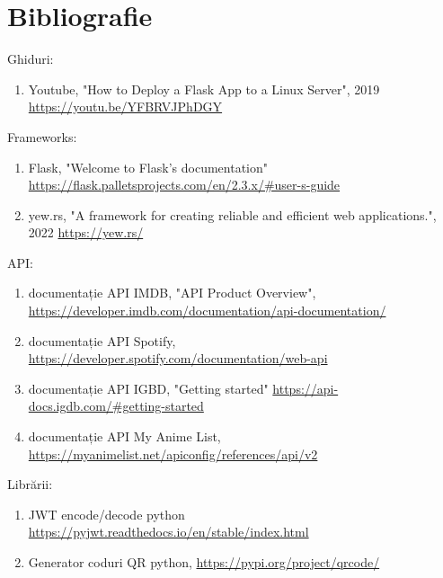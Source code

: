 \chapter*{Bibliografie} 
\label{Bibliografie}

\noindent Ghiduri:
\begin{enumerate}[noitemsep, leftmargin=0.3cm]
    \item Youtube, "How to Deploy a Flask App to a Linux Server", 2019\\
    \href{https://youtu.be/YFBRVJPhDGY}{https://youtu.be/YFBRVJPhDGY}
\end{enumerate}

\noindent Frameworks:
\begin{enumerate}[noitemsep, leftmargin=0.3cm]
    \item Flask, "Welcome to Flask’s documentation" \href{https://flask.palletsprojects.com/en/2.3.x/#user-s-guide}{https://flask.palletsprojects.com/en/2.3.x/\#user-s-guide}
    \item yew.rs, "A framework for creating reliable and efficient web applications.", 2022 \href{https://yew.rs/}{https://yew.rs/}
\end{enumerate}

\noindent API:
\begin{enumerate}[noitemsep, leftmargin=0.3cm]
\item documentație API IMDB, "API Product Overview", \href{https://developer.imdb.com/documentation/api-documentation/}{https://developer.imdb.com/documentation/api-documentation/} 
    \item documentație API Spotify, \href{https://developer.spotify.com/documentation/web-api}{https://developer.spotify.com/documentation/web-api}
    \item documentație API IGBD, "Getting started" \href{https://api-docs.igdb.com/#getting-started}{https://api-docs.igdb.com/\#getting-started}
    \item documentație API My Anime List, \href{https://myanimelist.net/apiconfig/references/api/v2}{https://myanimelist.net/apiconfig/references/api/v2}
\end{enumerate}

\noindent Librării:
\begin{enumerate}[noitemsep, leftmargin=0.3cm]
    \item JWT encode/decode python \href{https://pyjwt.readthedocs.io/en/stable/index.html}{https://pyjwt.readthedocs.io/en/stable/index.html}
    \item Generator coduri QR python, \href{https://pypi.org/project/qrcode/}{https://pypi.org/project/qrcode/}
\end{enumerate}


